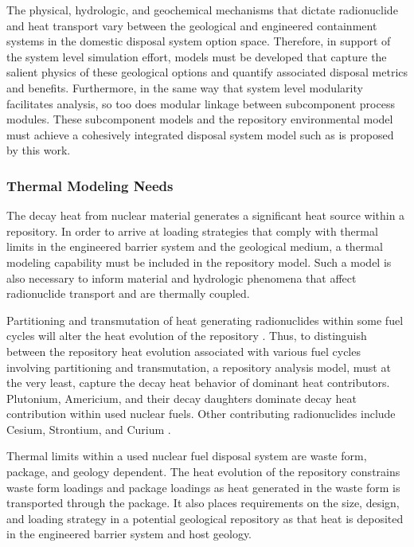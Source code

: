
The physical, hydrologic, and geochemical mechanisms that dictate 
radionuclide and heat transport vary between the geological and engineered 
containment systems in the domestic disposal system option space.  Therefore, 
in support of the system level simulation effort, models must be developed that 
capture the salient physics of these geological options and quantify associated 
disposal metrics and benefits.  Furthermore, in the same way that system level 
modularity facilitates analysis, so too does modular linkage between subcomponent 
process modules. These subcomponent models and the repository environmental model 
must achieve a cohesively integrated disposal system model such as is proposed by 
this work. 


\subsubsection{Thermal Modeling Needs}
The decay heat from nuclear material generates a significant heat source within a 
repository. In order to arrive at loading strategies that comply with thermal 
limits in the engineered barrier system and the geological medium, a thermal 
modeling capability must be included in the repository model. Such a model is 
also necessary to inform material and hydrologic phenomena that affect 
radionuclide transport and are thermally coupled. 

Partitioning and transmutation of heat generating radionuclides within  
some fuel cycles will alter the heat evolution of the repository 
\cite{swift_applying_2010}. Thus, to distinguish  between the repository heat 
evolution associated with various fuel cycles involving partitioning and 
transmutation, a repository analysis model, must at the very least, 
capture the decay heat behavior of dominant heat contributors.  Plutonium, 
Americium, and their decay daughters dominate decay heat contribution within 
used nuclear fuels. Other contributing radionuclides include Cesium, Strontium, 
and Curium \cite{piet_which_2007}. 

Thermal limits within a used nuclear fuel disposal system are waste form, 
package, and geology dependent. The heat evolution of the repository 
constrains waste form loadings and package loadings as heat 
generated in the waste form is transported through the package. It 
also places requirements on the size, design, and loading strategy in a 
potential geological repository as that heat is deposited in the engineered 
barrier system and host geology.

